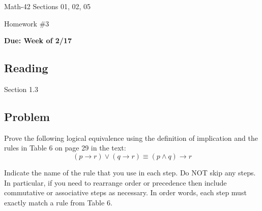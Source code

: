 \documentclass[letterpaper,12pt,fleqn]{article}
\renewcommand{\implies}{\rightarrow}
\begin{document}
\begin{center}
  \large
  Math-42 Sections 01, 02, 05

  \Large
  Homework \#3

  \large
  \textbf{Due: Week of 2/17}
\end{center}

\subsection*{Reading}

Section 1.3

\subsection*{Problem}

Prove the following logical equivalence using the definition of implication and the rules in Table 6 on page 29 in
the text:
\[(p\implies r)\lor(q\implies r)\equiv(p\land q)\implies r\]

Indicate the name of the rule that you use in each step.  Do NOT skip any steps.  In particular, if you need to
rearrange order or precedence then include commutative or associative steps as necessary.  In order words, each
step must exactly match a rule from Table 6.
\end{document}
